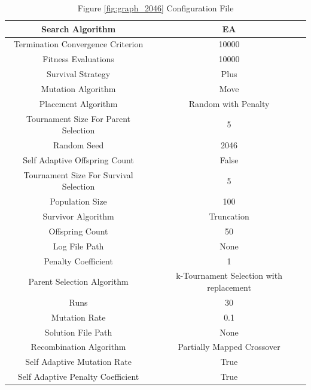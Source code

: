 \documentclass{standalone}
\begin{document}
\begin{table}[!htb]
	\centering
	\caption{Figure \ref{fig:graph_2046} Configuration File}
	\label{tab:graph_2046}
	\begin{tabular}{| c | c |}
		\hline
		Search Algorithm		& EA		 \\
		\hline
		Termination Convergence Criterion		& 10000		 \\
		\hline
		Fitness Evaluations		& 10000		 \\
		\hline
		Survival Strategy		& Plus		 \\
		\hline
		Mutation Algorithm		& Move		 \\
		\hline
		Placement Algorithm		& Random with Penalty		 \\
		\hline
		Tournament Size For Parent Selection		& 5		 \\
		\hline
		Random Seed		& 2046		 \\
		\hline
		Self Adaptive Offspring Count		& False		 \\
		\hline
		Tournament Size For Survival Selection		& 5		 \\
		\hline
		Population Size		& 100		 \\
		\hline
		Survivor Algorithm		& Truncation		 \\
		\hline
		Offspring Count		& 50		 \\
		\hline
		Log File Path		& None		 \\
		\hline
		Penalty Coefficient		& 1		 \\
		\hline
		Parent Selection Algorithm		& k-Tournament Selection with replacement		 \\
		\hline
		Runs		& 30		 \\
		\hline
		Mutation Rate		& 0.1		 \\
		\hline
		Solution File Path		& None		 \\
		\hline
		Recombination Algorithm		& Partially Mapped Crossover		 \\
		\hline
		Self Adaptive Mutation Rate		& True		 \\
		\hline
		Self Adaptive Penalty Coefficient		& True		 \\
		\hline
	\end{tabular}
\end{table}
\end{document}
